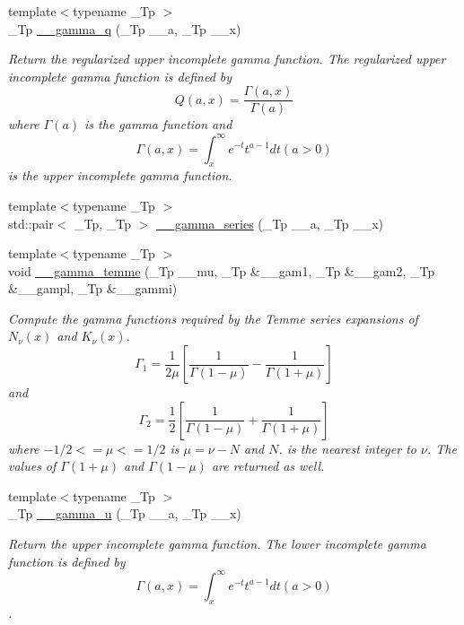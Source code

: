 \begin{DoxyCompactItemize}
{\footnotesize template$<$typename \+\_\+\+Tp $>$ }\\\+\_\+\+Tp \hyperlink{namespacestd_1_1____detail_a0ac19486073d0a7b2dc923b45b26777c}{\+\_\+\+\_\+gamma\+\_\+q} (\+\_\+\+Tp \+\_\+\+\_\+a, \+\_\+\+Tp \+\_\+\+\_\+x)
\begin{DoxyCompactList}\small\item\em Return the regularized upper incomplete gamma function. The regularized upper incomplete gamma function is defined by \[ Q(a,x) = \frac{\Gamma(a,x)}{\Gamma(a)} \] where $ \Gamma(a) $ is the gamma function and \[ \Gamma(a,x) = \int_x^\infty e^{-t}t^{a-1}dt (a > 0) \] is the upper incomplete gamma function. \end{DoxyCompactList}\item 
{\footnotesize template$<$typename \+\_\+\+Tp $>$ }\\std\+::pair$<$ \+\_\+\+Tp, \+\_\+\+Tp $>$ \hyperlink{namespacestd_1_1____detail_aa480c595e1c5b894d76398cf0e8eb02b}{\+\_\+\+\_\+gamma\+\_\+series} (\+\_\+\+Tp \+\_\+\+\_\+a, \+\_\+\+Tp \+\_\+\+\_\+x)
\item 
{\footnotesize template$<$typename \+\_\+\+Tp $>$ }\\void \hyperlink{namespacestd_1_1____detail_a101d608648b7ecb3d1c7a8500f902e6c}{\+\_\+\+\_\+gamma\+\_\+temme} (\+\_\+\+Tp \+\_\+\+\_\+mu, \+\_\+\+Tp \&\+\_\+\+\_\+gam1, \+\_\+\+Tp \&\+\_\+\+\_\+gam2, \+\_\+\+Tp \&\+\_\+\+\_\+gampl, \+\_\+\+Tp \&\+\_\+\+\_\+gammi)
\begin{DoxyCompactList}\small\item\em Compute the gamma functions required by the Temme series expansions of $ N_\nu(x) $ and $ K_\nu(x) $. \[ \Gamma_1 = \frac{1}{2\mu} [\frac{1}{\Gamma(1 - \mu)} - \frac{1}{\Gamma(1 + \mu)}] \] and \[ \Gamma_2 = \frac{1}{2} [\frac{1}{\Gamma(1 - \mu)} + \frac{1}{\Gamma(1 + \mu)}] \] where $ -1/2 <= \mu <= 1/2 $ is $ \mu = \nu - N $ and $ N $. is the nearest integer to $ \nu $. The values of $ \Gamma(1 + \mu) $ and $ \Gamma(1 - \mu) $ are returned as well. \end{DoxyCompactList}\item 
{\footnotesize template$<$typename \+\_\+\+Tp $>$ }\\\+\_\+\+Tp \hyperlink{namespacestd_1_1____detail_a3ba60e25252f0a54b1e70412df0d1068}{\+\_\+\+\_\+gamma\+\_\+u} (\+\_\+\+Tp \+\_\+\+\_\+a, \+\_\+\+Tp \+\_\+\+\_\+x)
\begin{DoxyCompactList}\small\item\em Return the upper incomplete gamma function. The lower incomplete gamma function is defined by \[ \Gamma(a,x) = \int_x^\infty e^{-t}t^{a-1}dt (a > 0) \]. \end{DoxyCompactList}\item 

\end{DoxyCompactItemize}
